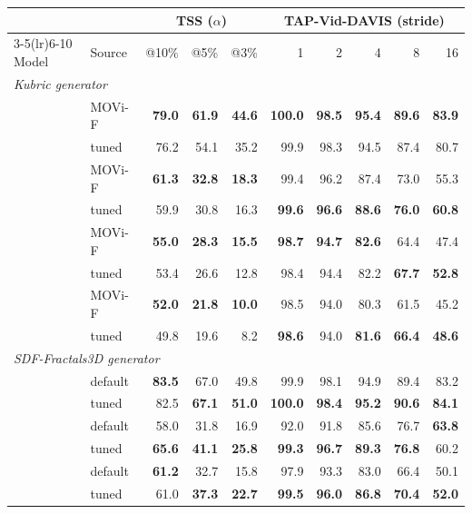 \begin{tabular}{ll rrrrrrrr}
\toprule
 &  & \multicolumn{3}{c}{TSS ($\alpha$)} & \multicolumn{5}{c}{TAP-Vid-DAVIS (stride)} \\
\cmidrule(lr){3-5}\cmidrule(lr){6-10}
Model & Source & @10\% & @5\% & @3\% & 1 & 2 & 4 & 8 & 16 \\
\midrule
\multicolumn{10}{l}{\emph{Kubric generator}} \\
\addlinespace[1pt]
\multirow{2}{*}{CATs++} & MOVi-F & \textbf{79.0} & \textbf{61.9} & \textbf{44.6} & \textbf{100.0} & \textbf{98.5} & \textbf{95.4} & \textbf{89.6} & \textbf{83.9} \\
 & tuned & 76.2 & 54.1 & 35.2 & 99.9 & 98.3 & 94.5 & 87.4 & 80.7 \\
\addlinespace[2pt]
\multirow{2}{*}{GLU-Net} & MOVi-F & \textbf{61.3} & \textbf{32.8} & \textbf{18.3} & 99.4 & 96.2 & 87.4 & 73.0 & 55.3 \\
 & tuned & 59.9 & 30.8 & 16.3 & \textbf{99.6} & \textbf{96.6} & \textbf{88.6} & \textbf{76.0} & \textbf{60.8} \\
\addlinespace[2pt]
\multirow{2}{*}{FlowFormer} & MOVi-F & \textbf{55.0} & \textbf{28.3} & \textbf{15.5} & \textbf{98.7} & \textbf{94.7} & \textbf{82.6} & 64.4 & 47.4 \\
 & tuned & 53.4 & 26.6 & 12.8 & 98.4 & 94.4 & 82.2 & \textbf{67.7} & \textbf{52.8} \\
\addlinespace[2pt]
\multirow{2}{*}{RAFT} & MOVi-F & \textbf{52.0} & \textbf{21.8} & \textbf{10.0} & 98.5 & 94.0 & 80.3 & 61.5 & 45.2 \\
 & tuned & 49.8 & 19.6 & 8.2 & \textbf{98.6} & 94.0 & \textbf{81.6} & \textbf{66.4} & \textbf{48.6} \\
\midrule
\multicolumn{10}{l}{\emph{SDF-Fractals3D generator}} \\
\addlinespace[1pt]
\multirow{2}{*}{CATs++} & default & \textbf{83.5} & 67.0 & 49.8 & 99.9 & 98.1 & 94.9 & 89.4 & 83.2 \\
 & tuned & 82.5 & \textbf{67.1} & \textbf{51.0} & \textbf{100.0} & \textbf{98.4} & \textbf{95.2} & \textbf{90.6} & \textbf{84.1} \\
\addlinespace[2pt]
\multirow{2}{*}{GLU-Net} & default & 58.0 & 31.8 & 16.9 & 92.0 & 91.8 & 85.6 & 76.7 & \textbf{63.8} \\
 & tuned & \textbf{65.6} & \textbf{41.1} & \textbf{25.8} & \textbf{99.3} & \textbf{96.7} & \textbf{89.3} & \textbf{76.8} & 60.2 \\
\addlinespace[2pt]
\multirow{2}{*}{FlowFormer} & default & \textbf{61.2} & 32.7 & 15.8 & 97.9 & 93.3 & 83.0 & 66.4 & 50.1 \\
 & tuned & 61.0 & \textbf{37.3} & \textbf{22.7} & \textbf{99.5} & \textbf{96.0} & \textbf{86.8} & \textbf{70.4} & \textbf{52.0} \\
\bottomrule
\end{tabular}
